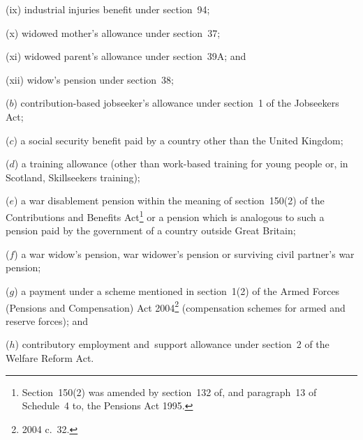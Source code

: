 \documentclass[12pt,a4paper]{article}
\begin{document}
\begin{enumerate}
\begin{enumerate}
(ix) industrial injuries benefit under section~94;

(x) widowed mother’s allowance under section~37;

(xi) widowed parent’s allowance under section~39A; and

(xii) widow’s pension under section~38;
\end{enumerate}

($b$) contribution-based jobseeker’s allowance under section~1 of the Jobseekers Act;

($c$) a social security benefit paid by a country other than the United Kingdom;

($d$) a training allowance (other than work-based training for young people or, in Scotland, Skillseekers training); 

($e$) a war disablement pension 
within the meaning of section~150(2) of the Contributions and Benefits Act\footnote{Section~150(2) was amended by section~132 of, and paragraph~13 of Schedule~4 to, the Pensions Act 1995.} or a pension which is analogous to such a pension paid by the government of a country outside Great Britain;


($f$) a war widow’s pension, war widower’s pension or surviving civil partner’s war pension;
%

($g$) a payment under a scheme mentioned in section~1(2) of the Armed Forces (Pensions and Compensation) Act 2004\footnote{2004 c.\ 32.} (compensation schemes for armed and reserve forces);
%
and

($h$) contributory employment and~support allowance under section~2 of the Welfare Reform Act.
\end{enumerate}
\end{document}
